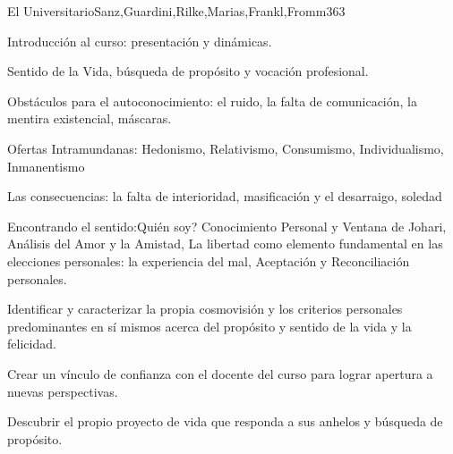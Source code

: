 \begin{syllabus}
\begin{unit}{El Universitario}{Sanz,Guardini,Rilke,Marias,Frankl,Fromm}{36}{3}
\begin{topics}
	\item Introducción al curso: presentación y dinámicas.
	\item Sentido de la Vida, búsqueda de propósito y vocación profesional.
	\item Obstáculos para el autoconocimiento: el ruido, la falta de comunicación, la mentira existencial, máscaras.
	\item Ofertas Intramundanas: Hedonismo, Relativismo, Consumismo, Individualismo, Inmanentismo
	\item Las consecuencias: la falta de interioridad, masificación y el desarraigo, soledad
	\item Encontrando el sentido:Quién soy? Conocimiento Personal y Ventana de Johari, Análisis del Amor y la Amistad, La libertad como elemento fundamental en las elecciones personales: la experiencia del mal, Aceptación y Reconciliación personales.
\end{topics}
\begin{unitgoals}
	\item Identificar y caracterizar la propia cosmovisión y los criterios personales predominantes en sí mismos acerca del propósito y sentido de la vida y la felicidad.
	\item Crear un vínculo de confianza con el docente del curso para lograr apertura a nuevas perspectivas.
	\item Descubrir el propio proyecto de vida que responda a sus anhelos y búsqueda de propósito.
\end{unitgoals}
\end{unit}


\end{syllabus}
